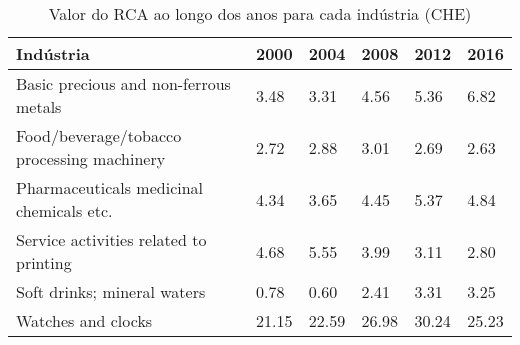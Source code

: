 \begin{table}
\centering
\caption{Valor do RCA ao longo dos anos para cada indústria (CHE)}
\begin{tabular}{p{6cm}p{1.5cm}p{1.5cm}p{1.5cm}p{1.5cm}p{1.5cm}}
\toprule
                                 Indústria &  2000 &  2004 &  2008 &  2012 &  2016 \\
\midrule
     Basic precious and non-ferrous metals &  3.48 &  3.31 &  4.56 &  5.36 &  6.82 \\
Food/beverage/tobacco processing machinery &  2.72 &  2.88 &  3.01 &  2.69 &  2.63 \\
  Pharmaceuticals medicinal chemicals etc. &  4.34 &  3.65 &  4.45 &  5.37 &  4.84 \\
    Service activities related to printing &  4.68 &  5.55 &  3.99 &  3.11 &  2.80 \\
               Soft drinks; mineral waters &  0.78 &  0.60 &  2.41 &  3.31 &  3.25 \\
                        Watches and clocks & 21.15 & 22.59 & 26.98 & 30.24 & 25.23 \\
\bottomrule
\end{tabular}
\end{table}
